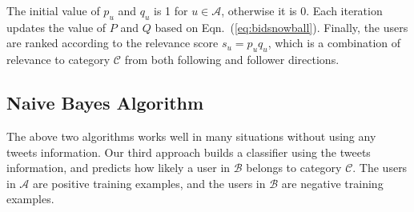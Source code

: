 \documentclass{article}
\begin{document}

The initial value of $p_u$ and $q_u$ is 1 for $u \in \mathcal{A}$, otherwise it is 0. Each iteration updates the value of $P$ and $Q$ based on Eqn.~(\ref{eq:bidsnowball}). Finally, the users are ranked according to the relevance score $s_u = p_u q_u$, which is a combination of relevance to category $\mathcal{C}$ from both following and follower directions.

\subsection{Naive Bayes Algorithm}

The above two algorithms works well in many situations without using any tweets information. %
Our third approach builds a classifier using the tweets information, and predicts how likely a user in $\mathcal{B}$ belongs to category $\mathcal{C}$. The users in $\mathcal{A}$ are positive training examples, and the users in $\mathcal{B}$ are negative training examples.
\end{document}

